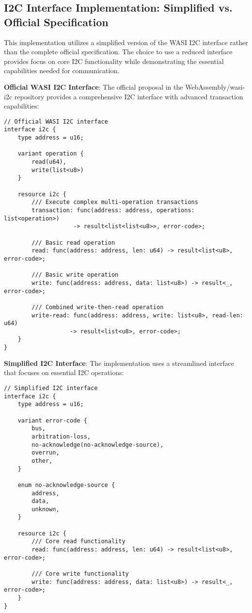 \subsection{I2C Interface Implementation: Simplified vs. Official Specification}

This implementation utilizes a simplified version of the WASI I2C interface rather than the complete official specification. The choice to use a reduced interface provides focus on core I2C functionality while demonstrating the essential capabilities needed for communication.

\textbf{Official WASI I2C Interface}: The official proposal in the WebAssembly/wasi-i2c repository provides a comprehensive I2C interface with advanced transaction capabilities:

\begin{verbatim}
// Official WASI I2C interface
interface i2c {
    type address = u16;
    
    variant operation {
        read(u64),
        write(list<u8>)
    }

    resource i2c {
        /// Execute complex multi-operation transactions
        transaction: func(address: address, operations: list<operation>) 
                    -> result<list<list<u8>>, error-code>;
        
        /// Basic read operation
        read: func(address: address, len: u64) -> result<list<u8>, error-code>;
        
        /// Basic write operation  
        write: func(address: address, data: list<u8>) -> result<_, error-code>;
        
        /// Combined write-then-read operation
        write-read: func(address: address, write: list<u8>, read-len: u64) 
                   -> result<list<u8>, error-code>;
    }
}
\end{verbatim}

\textbf{Simplified I2C Interface}: The implementation uses a streamlined interface that focuses on essential I2C operations:

\begin{verbatim}
// Simplified I2C interface
interface i2c {
    type address = u16;
    
    variant error-code {
        bus,
        arbitration-loss,
        no-acknowledge(no-acknowledge-source),
        overrun,
        other,
    }

    enum no-acknowledge-source {
        address,
        data,
        unknown,
    }

    resource i2c {
        /// Core read functionality
        read: func(address: address, len: u64) -> result<list<u8>, error-code>;
        
        /// Core write functionality
        write: func(address: address, data: list<u8>) -> result<_, error-code>;
    }
}
\end{verbatim}

